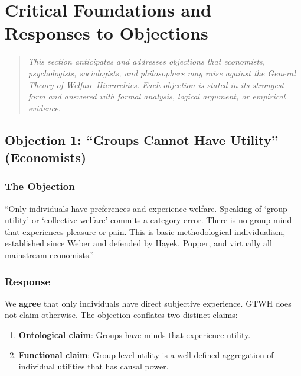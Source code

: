 \section{Critical Foundations and Responses to Objections}
\label{sec:aaa-critical}

\begin{quote}
\textit{This section anticipates and addresses objections that economists, 
psychologists, sociologists, and philosophers may raise against the General 
Theory of Welfare Hierarchies. Each objection is stated in its strongest form 
and answered with formal analysis, logical argument, or empirical evidence.}
\end{quote}

\subsection{Objection 1: ``Groups Cannot Have Utility'' (Economists)}

\subsubsection{The Objection}

\begin{tcolorbox}[colback=red!5!white, colframe=red!75!black, title=Economist's Objection]
``Only individuals have preferences and experience welfare. Speaking of 
`group utility' or `collective welfare' commits a category error. There is 
no group mind that experiences pleasure or pain. This is basic methodological 
individualism, established since Weber and defended by Hayek, Popper, and 
virtually all mainstream economists.''
\end{tcolorbox}

\subsubsection{Response}

We \textbf{agree} that only individuals have direct subjective experience. 
GTWH does not claim otherwise. The objection conflates two distinct claims:

\begin{enumerate}
\item \textbf{Ontological claim}: Groups have minds that experience utility.
\item \textbf{Functional claim}: Group-level utility is a well-defined aggregation 
of individual utilities that has causal power.
\end{enumerate}

